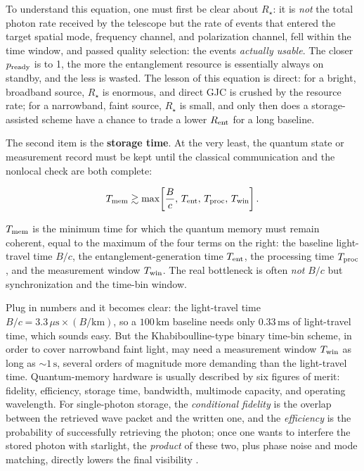 To understand this equation, one must first be clear about \(R_\star\): it is \emph{not} the total photon rate received by the telescope but the rate of events that entered the target spatial mode, frequency channel, and polarization channel, fell within the time window, and passed quality selection: the events \emph{actually usable}. The closer \(p_{\rm ready}\) is to 1, the more the entanglement resource is essentially always on standby, and the less is wasted. The lesson of this equation is direct: for a bright, broadband source, \(R_\star\) is enormous, and direct GJC is crushed by the resource rate; for a narrowband, faint source, \(R_\star\) is small, and only then does a storage-assisted scheme have a chance to trade a lower \(R_{\rm ent}\) for a long baseline.

The second item is the \textbf{storage time}. At the very least, the quantum state or measurement record must be kept until the classical communication and the nonlocal check are both complete:

\begin{equation}
  T_{\rm mem}
  \gtrsim
  \max\!\left[\frac{B}{c},\,T_{\rm ent},\,T_{\rm proc},\,T_{\rm win}\right].
  \label{eq:e24-memory-time}
\end{equation}
\begin{formulaexplain}
\(T_{\rm mem}\) is the minimum time for which the quantum memory must remain coherent, equal to the maximum of the four terms on the right: the baseline light-travel time \(B/c\), the entanglement-generation time \(T_{\rm ent}\), the processing time \(T_{\rm proc}\), and the measurement window \(T_{\rm win}\). The real bottleneck is often \emph{not} \(B/c\) but synchronization and the time-bin window.
\end{formulaexplain}

Plug in numbers and it becomes clear: the light-travel time \(B/c=3.3\,\mu\mathrm{s}\times(B/\mathrm{km})\), so a \(100\,\mathrm{km}\) baseline needs only \(0.33\,\mathrm{ms}\) of light-travel time, which sounds easy. But the Khabiboulline-type binary time-bin scheme, in order to cover narrowband faint light, may need a measurement window \(T_{\rm win}\) as long as \(\sim1\,\mathrm{s}\), several orders of magnitude more demanding than the light-travel time. Quantum-memory hardware is usually described by six figures of merit: fidelity, efficiency, storage time, bandwidth, multimode capacity, and operating wavelength. For single-photon storage, the \emph{conditional fidelity} is the overlap between the retrieved wave packet and the written one, and the \emph{efficiency} is the probability of successfully retrieving the photon; once one wants to interfere the stored photon with starlight, the \emph{product} of these two, plus phase noise and mode matching, directly lowers the final visibility \citep{2009NaPho...3..706L,2010EPJD...58....1S,2016JMOp...63.2005H}.

